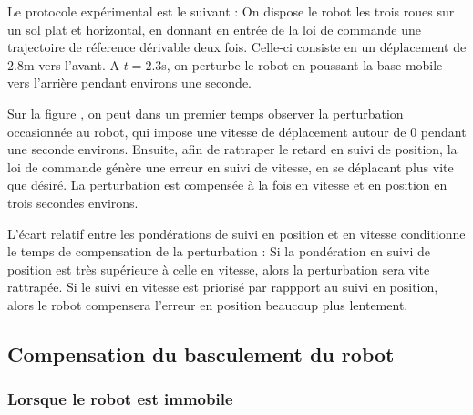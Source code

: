 	      Le protocole expérimental est le suivant :
	      On dispose le robot les trois roues sur un sol plat et horizontal, en donnant en entrée de la loi de commande une trajectoire de réference dérivable deux fois.
	      Celle-ci consiste en un déplacement de $2.8$m vers l'avant.
	      A $t=2.3$s, on perturbe le robot en poussant la base mobile vers l'arrière pendant environs une seconde.
	      
	    
	      Sur la figure , on peut dans un premier temps observer la perturbation occasionnée au robot, qui impose une vitesse de déplacement autour de $0$ pendant une seconde environs.
	      Ensuite, afin de rattraper le retard en suivi de position, la loi de commande génère une erreur en suivi de vitesse, en se déplacant plus vite que désiré.
	      La perturbation est compensée à la fois en vitesse et en position en trois secondes environs.
	      
	      L'écart relatif entre les pondérations de suivi en position et en vitesse conditionne le temps de compensation de la perturbation :
	      Si la pondération en suivi de position est très supérieure à celle en vitesse, alors la perturbation sera vite rattrapée. 
	      Si le suivi en vitesse est priorisé par rappport au suivi en position, alors le robot compensera l'erreur en position beaucoup plus lentement.
	      
	    
	\subsection{Compensation du basculement du robot}
	
	  \subsubsection{Lorsque le robot est immobile}
	
	      
